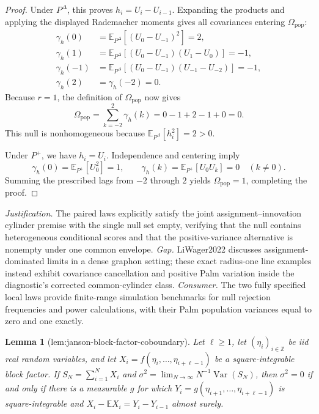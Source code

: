 \documentclass{article}
\newtheorem{lemma}{Lemma}
\begin{document}
\begin{proof}
Under \(P^{\Delta}\), this proves \(h_i=U_i-U_{i-1}\).  Expanding the products and applying the displayed Rademacher moments gives all covariances entering \(\Omega_{\mathrm{pop}}\):
\[
\begin{aligned}
 \gamma_h(0)
 &=\mathbb E_{P^{\Delta}}[(U_0-U_{-1})^2]=2,\\
 \gamma_h(1)
 &=\mathbb E_{P^{\Delta}}[(U_0-U_{-1})(U_1-U_0)]=-1,\\
 \gamma_h(-1)
 &=\mathbb E_{P^{\Delta}}[(U_0-U_{-1})(U_{-1}-U_{-2})]=-1,\\
 \gamma_h(2)&=\gamma_h(-2)=0.
\end{aligned}
\]
Because \(r=1\), the definition of \(\Omega_{\mathrm{pop}}\) now gives
\[
 \Omega_{\mathrm{pop}}
 =\sum_{k=-2}^{2}\gamma_h(k)
 =0-1+2-1+0
 =0.
\]
This null is nonhomogeneous because \(\mathbb E_{P^{\Delta}}[h_i^2]=2>0\).

Under \(P^+\), we have \(h_i=U_i\).  Independence and centering imply
\[
 \gamma_h(0)=\mathbb E_{P^+}[U_0^2]=1,
 \qquad
 \gamma_h(k)=\mathbb E_{P^+}[U_0U_k]=0\quad(k\ne0).
\]
Summing the prescribed lags from \(-2\) through \(2\) yields \(\Omega_{\mathrm{pop}}=1\), completing the proof.
\end{proof}
\par\smallskip\noindent \textit{Justification.} The paired laws explicitly satisfy the joint assignment--innovation cylinder premise with the single null set empty, verifying that the null contains heterogeneous conditional scores and that the positive-variance alternative is nonempty under one common envelope. \textit{Gap.} LiWager2022 discusses assignment-dominated limits in a dense graphon setting; these exact radius-one line examples instead exhibit covariance cancellation and positive Palm variation inside the diagnostic's corrected common-cylinder class. \textit{Consumer.} The two fully specified local laws provide finite-range simulation benchmarks for null rejection frequencies and power calculations, with their Palm population variances equal to zero and one exactly.

\begin{lemma}[lem:janson-block-factor-coboundary]\label{lem:janson-block-factor-coboundary}
Let \(\ell\ge1\), let \((\eta_i)_{i\in\mathbb Z}\) be iid real random variables, and let \(X_i=f(\eta_i,\ldots,\eta_{i+\ell-1})\) be a square-integrable block factor. If \(S_N=\sum_{i=1}^N X_i\) and \(\sigma^2=\lim_{N\to\infty}N^{-1}\operatorname{Var}(S_N)\), then \(\sigma^2=0\) if and only if there is a measurable \(g\) for which \(Y_i=g(\eta_{i+1},\ldots,\eta_{i+\ell-1})\) is square-integrable and \(X_i-\mathbb E X_i=Y_i-Y_{i-1}\) almost surely.
\end{lemma}
\end{document}
